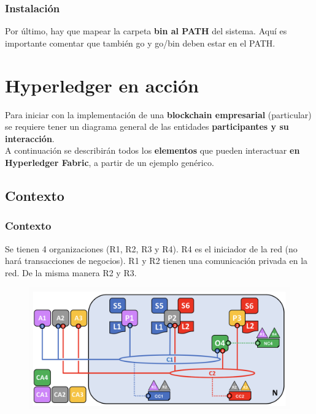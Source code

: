 \documentclass{beamer}
\begin{document}
	\begin{frame}
		\frametitle{Instalación}
		Por último, hay que mapear la carpeta \textbf{bin al PATH} del sistema. Aquí es importante comentar que también go y go/bin deben estar en el PATH.
		\begin{center}
			\setlength{\fboxrule}{1mm}
			\setlength{\fboxsep}{3mm}
		\end{center}
	\end{frame}

	\section{Hyperledger en acción}
	
	\begin{frame}
		Para iniciar con la implementación de una \textbf{blockchain empresarial} (particular) se requiere tener un diagrama general de las entidades \textbf{participantes y su interacción}.\\
		\vspace{4mm}
		A continuación se describirán todos los \textbf{elementos} que pueden interactuar \textbf{en Hyperledger Fabric}, a partir de un ejemplo genérico.
	\end{frame}
	
	\subsection{Contexto}
	
	\begin{frame}
		\frametitle{Contexto}
		Se tienen 4 organizaciones (R1, R2, R3 y R4). R4 es el iniciador de la red (no hará transacciones de negocios). R1 y R2 tienen una comunicación privada en la red. De la misma manera R2 y R3.
		\begin{figure}[h]
			\includegraphics[scale=.3]{start_01}
			\centering
		\end{figure}
	\end{frame}
	
\end{document}
